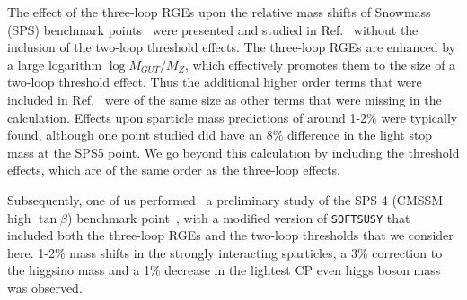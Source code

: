 \documentclass[final,3p,times,pdflatex]{elsarticle}
\begin{document}
The effect of the three-loop RGEs upon the relative mass shifts 
of Snowmass (SPS) benchmark 
points~\cite{Allanach:2002nj} were presented and studied in 
Ref.~\cite{Jack:2004ch} 
without the inclusion of the two-loop threshold effects. 
The three-loop RGEs are enhanced by a large logarithm $\log M_{GUT}/M_Z$,
which effectively promotes them to the size of a two-loop threshold effect. 
Thus the additional higher order terms that were included in
Ref.~\cite{Jack:2004ch} were of the same size as other terms that were
missing in the calculation. Effects upon sparticle mass predictions of around
1-2$\%$ were typically found, although one point studied did have an 8$\%$
difference in the light stop mass at the SPS5 point. 
We go beyond this calculation by including the threshold effects, which are of
the same order as the three-loop effects.

Subsequently, one of us performed~\cite{Bednyakov:2010ni} a preliminary study
of the SPS 4 (CMSSM high
$\tan \beta$) benchmark
point~\cite{Allanach:2002nj}, with a modified version of {\tt SOFTSUSY} that
included both the three-loop RGEs and the two-loop thresholds that we consider
here. 1-2$\%$ mass shifts in the strongly interacting sparticles, a 3$\%$
correction to the higgsino mass and a 1$\%$ decrease in the lightest CP even
higgs boson mass was observed. 
\end{document}

